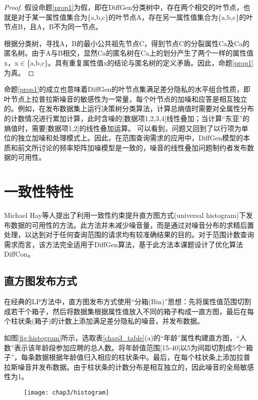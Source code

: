\begin{proof}
  假设命题\ref{prop1}为假，即在DiffGen分类树中，存在两个相交的叶节点，也就是对于某一属性值集合为\{a,b,c\}的叶节点A，存在另一属性值集合为\{a,b,c\}的叶节点B，且A，B不为同一节点。
  	
  根据分类树，寻找A，B的最小公共祖先节点C，得到节点C的分裂属性Ca及Ca的匿名树。由于A与B相交，显然Ca的匿名树在Ca上的划分产生了两个一样的属性值x，x$\in$\{a,b,c\}。具有重复属性值x的结论与匿名树的定义矛盾。因此，命题\ref{prop1}为真。
\end{proof}

命题\ref{prop1}的成立也意味着DiffGen的叶节点集满足差分隐私的水平组合性质\cite{dpcombination}，即叶节点上拉普拉斯噪音的敏感性为一常量，每个叶节点的加噪和应答是相互独立的。例如，在发布数据集上运行决策树分类算法，计算总熵值时需要对全属性分布的计数情况进行累加计算，此时含噪的[数据项1,2,3,4]线性叠加；当计算“东亚”的熵值时，需要[数据项1,2]的线性叠加运算。
可以看到，问题又回到了以行项为单位的独立加噪和处理模式上。因此，在范围查询需求的应用中，DiffGen模型的本质和前文所讨论的频率矩阵加噪模型是一致的，噪音的线性叠加问题制约者发布数据的可用性。


\section{一致性特性}

Michael Hay等人提出了利用一致性约束提升直方图方式(universal histogram)下发布数据的可用性的方法\cite{boosting}。此方法并未减少噪音量，而是通过对噪音分布的求精后置处理，以达到对于任何查询范围的请求均有较准确结果的目的。对于范围计数查询需求而言，该方法完全适用于DiffGen算法，基于此方法本课题设计了优化算法DiffCon。

\subsection{直方图发布方式}

在经典的LP\cite{Dwork Calibrating}方法中，直方图发布方式使用“分箱(Bin)”思想：先将属性值范围切割成若干个箱子，然后将数据集根据属性值放入不同的箱子构成一直方图，最后在每个柱状条(箱子)的计数上添加满足差分隐私的噪音，并发布数据。

如图\ref{fig:histogram}所示，选取表\ref{chap3_table}(a)的“年龄”属性构建直方图，“人数”表示该年龄段参加应聘的总人数。将年龄值范围[15-40]以5为间距切割成5个“箱子”，每条数据根据年龄值归入相应的柱状条中。最后，在每个柱状条上添加拉普拉斯噪音并发布数据。由于柱状条的计数分布是相互独立的，因此噪音的全局敏感性为1。

\begin{figure}[!htp]
	\centering
	\texttt{[image: chap3/histogram]}
\end{figure}

